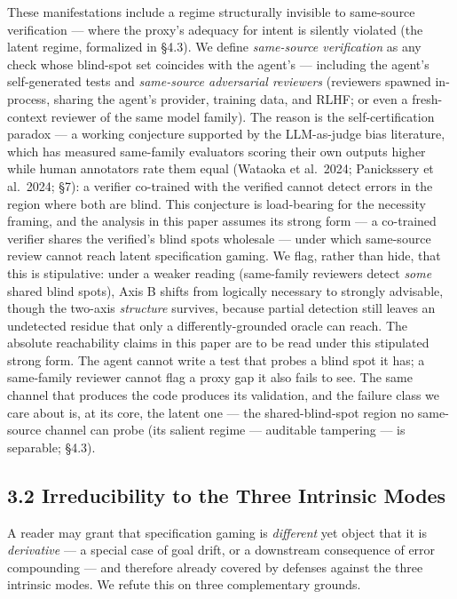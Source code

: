 \documentclass[
  11pt,
]{article}
\begin{document}
These manifestations include a regime structurally invisible to
same-source verification --- where the proxy's adequacy for intent is
silently violated (the latent regime, formalized in §4.3). We define
\emph{same-source verification} as any check whose blind-spot set
coincides with the agent's --- including the agent's self-generated
tests and \emph{same-source adversarial reviewers} (reviewers spawned
in-process, sharing the agent's provider, training data, and RLHF; or
even a fresh-context reviewer of the same model family). The reason is
the self-certification paradox --- a working conjecture supported by the
LLM-as-judge bias literature, which has measured same-family evaluators
scoring their own outputs higher while human annotators rate them equal
(Wataoka et al.~2024; Panickssery et al.~2024; §7): a verifier
co-trained with the verified cannot detect errors in the region where
both are blind. This conjecture is load-bearing for the necessity
framing, and the analysis in this paper assumes its strong form --- a
co-trained verifier shares the verified's blind spots wholesale ---
under which same-source review cannot reach latent specification gaming.
We flag, rather than hide, that this is stipulative: under a weaker
reading (same-family reviewers detect \emph{some} shared blind spots),
Axis B shifts from logically necessary to strongly advisable, though the
two-axis \emph{structure} survives, because partial detection still
leaves an undetected residue that only a differently-grounded oracle can
reach. The absolute reachability claims in this paper are to be read
under this stipulated strong form. The agent cannot write a test that
probes a blind spot it has; a same-family reviewer cannot flag a proxy
gap it also fails to see. The same channel that produces the code
produces its validation, and the failure class we care about is, at its
core, the latent one --- the shared-blind-spot region no same-source
channel can probe (its salient regime --- auditable tampering --- is
separable; §4.3).

\subsection{3.2 Irreducibility to the Three Intrinsic
Modes}\label{irreducibility-to-the-three-intrinsic-modes}

A reader may grant that specification gaming is \emph{different} yet
object that it is \emph{derivative} --- a special case of goal drift, or
a downstream consequence of error compounding --- and therefore already
covered by defenses against the three intrinsic modes. We refute this on
three complementary grounds.
\end{document}
